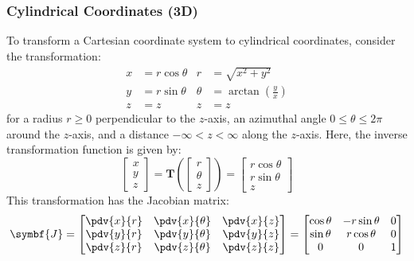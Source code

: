 \documentclass{article}
\begin{document}
\subsubsection{Cylindrical Coordinates (3D)}
To transform a Cartesian coordinate system to cylindrical coordinates,
consider the transformation:
\begin{align*}
    x & = r \cos{\theta} & r      & = \sqrt{x^2 + y^2}                    \\
    y & = r \sin{\theta} & \theta & = \arctan{\left( \frac{y}{x} \right)} \\
    z & = z              & z      & = z
\end{align*}
for a radius \(r \geqslant 0\) perpendicular to the \(z\)-axis, an
azimuthal angle \(0 \leqslant \theta \leqslant 2\pi\) around the
\(z\)-axis, and a distance \(-\infty < z < \infty\) along the
\(z\)-axis. Here, the inverse transformation function is given by:
\begin{equation*}
    \begin{bmatrix}
        x \\
        y \\
        z
    \end{bmatrix}
    = \symbf{T}\left(
    \begin{bmatrix}
            r      \\
            \theta \\
            z
        \end{bmatrix}
    \right) =
    \begin{bmatrix}
        r \cos{\theta} \\
        r \sin{\theta} \\
        z
    \end{bmatrix}
\end{equation*}
This transformation has the Jacobian matrix:
\begin{equation*}
    \symbf{J} =
    \begin{bmatrix}
        \displaystyle\pdv{x}{r} & \displaystyle\pdv{x}{\theta} & \displaystyle\pdv{x}{z} \\
        \displaystyle\pdv{y}{r} & \displaystyle\pdv{y}{\theta} & \displaystyle\pdv{y}{z} \\
        \displaystyle\pdv{z}{r} & \displaystyle\pdv{z}{\theta} & \displaystyle\pdv{z}{z}
    \end{bmatrix}
    =
    \begin{bmatrix}
        \cos{\theta} & -r \sin{\theta} & 0 \\
        \sin{\theta} & r \cos{\theta}  & 0 \\
        0            & 0               & 1
    \end{bmatrix}
\end{equation*}
\end{document}
